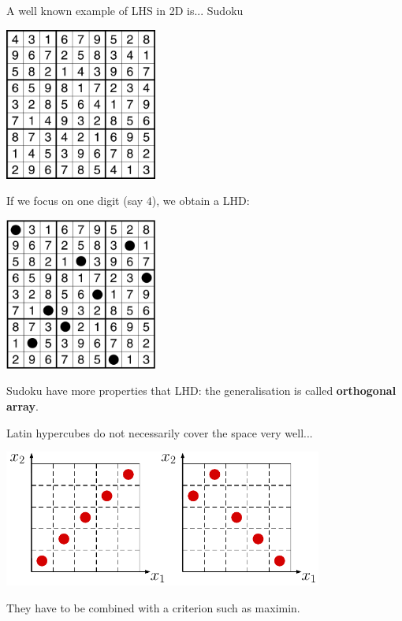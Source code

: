 \begin{frame}{}
A well known example of LHS in 2D is... Sudoku
\vspace{5mm}
\begin{center}
\includegraphics[height=5cm]{2_Design_of_experiments/figures/sudoku}
\end{center}
\end{frame}

\begin{frame}{}
If we focus on one digit (say $4$), we obtain a LHD:
\vspace{2mm}
\begin{center}
\includegraphics[height=5cm]{2_Design_of_experiments/figures/latexdraw/sudoku}
\end{center}
Sudoku have more properties that LHD: the generalisation is called \textbf{orthogonal array}.
\end{frame}

\begin{frame}{}
Latin hypercubes do not necessarily cover the space very well...
\begin{center}
\includegraphics[height=4.5cm]{2_Design_of_experiments/figures/latexdraw/lhs2}
\end{center}
They have to be combined with a criterion such as maximin.
\end{frame}

